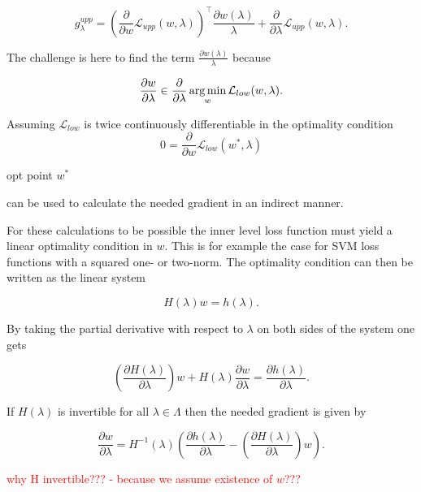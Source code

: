 \begin{equation*}
	g^{upp}_{\lambda} = \left(\frac{\partial}{\partial w}\mathcal{L}_{upp}(w,\lambda) \right)^{\top}\frac{\partial w(\lambda)}{\lambda}+\frac{\partial}{\partial \lambda}\mathcal{L}_{upp}(w,\lambda).
\end{equation*}

The challenge is here to find the term \(\frac{\partial w(\lambda)}{\lambda}\) because 

\[ \frac{\partial w}{\partial \lambda} \in \frac{\partial }{\partial \lambda} \operatorname*{arg\,min}_{w} \mathcal{L}_{low}(w,\lambda). \]

Assuming \(\mathcal{L}_{low}\) is twice continuously differentiable in the optimality condition 
\begin{equation*}
	0 = \frac{\partial}{\partial w}\mathcal{L}_{low}(w^*,\lambda)
\label{opt_con}
\end{equation*}

opt point \(w^*\)

can be used to calculate the needed gradient in an indirect manner.

For these calculations to be possible the inner level loss function must yield a linear optimality condition in \(w\). This is for example the case for SVM loss functions with a squared one- or two-norm.
The optimality condition can then be written as the linear system

\begin{equation*}
	H(\lambda)w = h(\lambda).
\end{equation*}

By taking the partial derivative with respect to \(\lambda\) on both sides of the system one gets

\begin{equation*}
	\left( \frac{\partial H(\lambda)}{\partial \lambda}\right)w+H(\lambda)\frac{\partial w}{\partial \lambda} = \frac{\partial h(\lambda)}{\partial  \lambda}.
\end{equation*}

If \(H(\lambda)\) is invertible for all \(\lambda \in \Lambda\) then the needed gradient is given by 

\begin{equation*}
	\frac{\partial w}{\partial \lambda} = H^{-1}(\lambda)\left(\frac{\partial h(\lambda)}{\partial \lambda}-\left(\frac{\partial H(\lambda)}{\partial \lambda}\right)w\right).
\end{equation*}

\textcolor{red}{why H invertible??? - because we assume existence of \(w\)???}\\

